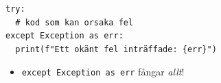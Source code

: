 \begin{frame}[fragile]
  \begin{verbatim}
try:
  # kod som kan orsaka fel
except Exception as err:
  print(f"Ett okänt fel inträffade: {err}")
  \end{verbatim}
  \begin{remark}
    \begin{itemize}
      \item \texttt{except Exception as err} fångar \emph{allt}!
    \end{itemize}
  \end{remark}
\end{frame}

\begin{frame}[fragile]
  \begin{example}[manyerr.py]
    \inputminted{python}{examples/manyerr.py}
  \end{example}
\end{frame}

